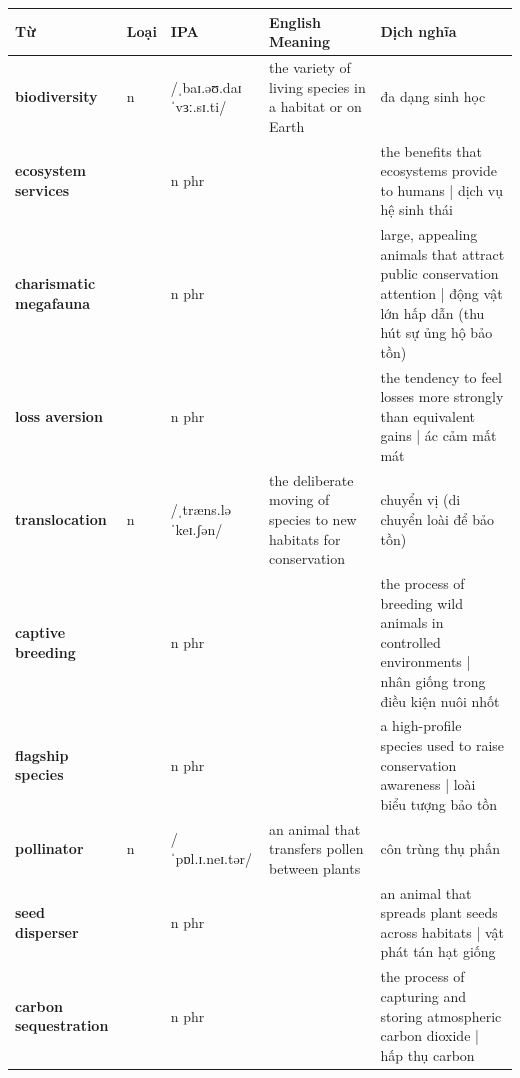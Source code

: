 \vspace{0.8em}
\begin{center}
\renewcommand{\arraystretch}{1.65}
\begin{tabularx}{\textwidth}{|V{0.22\textwidth}|C{0.07\textwidth}|I{0.20\textwidth}|Y|V{0.18\textwidth}|}
\hline
{}
\textbf{Từ} & \textbf{Loại} & \textbf{IPA} & \textbf{English Meaning} & \textbf{Dịch nghĩa} \\
\hline
\textbf{biodiversity} & n & /ˌbaɪ.əʊ.daɪˈvɜː.sɪ.ti/ & the variety of living species in a habitat or on Earth & đa dạng sinh học \\ \hline
\textbf{ecosystem services} & & n phr & & the benefits that ecosystems provide to humans | dịch vụ hệ sinh thái \\ \hline
\textbf{charismatic megafauna} & & n phr & & large, appealing animals that attract public conservation attention | động vật lớn hấp dẫn (thu hút sự ủng hộ bảo tồn) \\ \hline
\textbf{loss aversion} & & n phr & & the tendency to feel losses more strongly than equivalent gains | ác cảm mất mát \\ \hline
\textbf{translocation} & n & /ˌtræns.ləˈkeɪ.ʃən/ & the deliberate moving of species to new habitats for conservation & chuyển vị (di chuyển loài để bảo tồn) \\ \hline
\textbf{captive breeding} & & n phr & & the process of breeding wild animals in controlled environments | nhân giống trong điều kiện nuôi nhốt \\ \hline
\textbf{flagship species} & & n phr & & a high-profile species used to raise conservation awareness | loài biểu tượng bảo tồn \\ \hline
\textbf{pollinator} & n & /ˈpɒl.ɪ.neɪ.tər/ & an animal that transfers pollen between plants & côn trùng thụ phấn \\ \hline
\textbf{seed disperser} & & n phr & & an animal that spreads plant seeds across habitats | vật phát tán hạt giống \\ \hline
\textbf{carbon sequestration} & & n phr & & the process of capturing and storing atmospheric carbon dioxide | hấp thụ carbon \\ \hline
\end{tabularx}
\end{center}

\newpage

